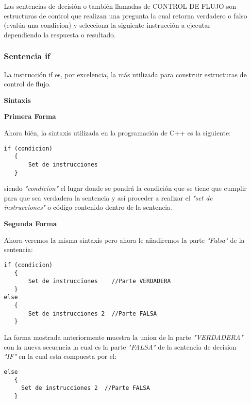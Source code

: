 Las sentencias de decisión o también llamadas de CONTROL DE FLUJO son estructuras de control que realizan una pregunta la cual retorna verdadero o falso (evalúa una condicion) y selecciona la siguiente instrucción a ejecutar dependiendo la respuesta o resultado.


\subsubsection{Sentencia if}

La instrucción if es, por excelencia, la más utilizada para construir estructuras de control de flujo.

\begin{center}
	\textbf{Sintaxis}
\end{center}

\textbf{Primera Forma}

Ahora bién, la sintaxis utilizada en la programación de C++ es la siguiente:

\begin{lstlisting}[style=Cpp, label=sintaxis-if, caption=Sintaxis If]
if (condicion)
   {
       Set de instrucciones
   }
\end{lstlisting}

siendo \textit{"condicion"} el lugar donde se pondrá la condición que se tiene que cumplir para que sea verdadera la sentencia y así proceder a realizar el \textit{"set de instrucciones"} o código contenido dentro de la sentencia.

\textbf{Segunda Forma}

Ahora veremos la misma sintaxis pero ahora le añadiremos la parte \textit{"Falsa"} de la sentencia:

\begin{lstlisting}[style=Cpp, label=sintaxis-if-else, caption=Sintaxis If Else]
if (condicion)
   {
       Set de instrucciones    //Parte VERDADERA
   }
else
   {
       Set de instrucciones 2  //Parte FALSA
   }
\end{lstlisting}

La forma mostrada anteriormente muestra la union de la parte \textit{"VERDADERA"} con la nueva secuencia la cual es la parte \textit{"FALSA"} de la sentencia de decision \textit{"IF"} en la cual esta compuesta por el:

\begin{lstlisting}[style=Cpp, label=sintaxis-else, caption=Sintaxis Else]
else
   {
     Set de instrucciones 2  //Parte FALSA
   }
\end{lstlisting}

